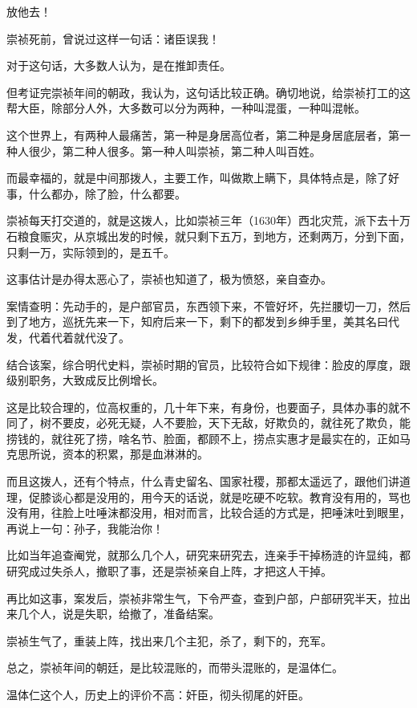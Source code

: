 \begin{multicols}{\theparacolNo}
		放他去！

		崇祯死前，曾说过这样一句话：诸臣误我！

		对于这句话，大多数人认为，是在推卸责任。

		但考证完崇祯年间的朝政，我认为，这句话比较正确。确切地说，给崇祯打工的这帮大臣，除部分人外，大多数可以分为两种，一种叫混蛋，一种叫混帐。

		这个世界上，有两种人最痛苦，第一种是身居高位者，第二种是身居底层者，第一种人很少，第二种人很多。第一种人叫崇祯，第二种人叫百姓。

		而最幸福的，就是中间那拨人，主要工作，叫做欺上瞒下，具体特点是，除了好事，什么都办，除了脸，什么都要。

		崇祯每天打交道的，就是这拨人，比如崇祯三年（1630年）西北灾荒，派下去十万石粮食赈灾，从京城出发的时候，就只剩下五万，到地方，还剩两万，分到下面，只剩一万，实际领到的，是五千。

		这事估计是办得太恶心了，崇祯也知道了，极为愤怒，亲自查办。

		案情查明：先动手的，是户部官员，东西领下来，不管好坏，先拦腰切一刀，然后到了地方，巡抚先来一下，知府后来一下，剩下的都发到乡绅手里，美其名曰代发，代着代着就代没了。

		结合该案，综合明代史料，崇祯时期的官员，比较符合如下规律：脸皮的厚度，跟级别职务，大致成反比例增长。

		这是比较合理的，位高权重的，几十年下来，有身份，也要面子，具体办事的就不同了，树不要皮，必死无疑，人不要脸，天下无敌，好欺负的，就往死了欺负，能捞钱的，就往死了捞，啥名节、脸面，都顾不上，捞点实惠才是最实在的，正如马克思所说，资本的积累，那是血淋淋的。

		而且这拨人，还有个特点，什么青史留名、国家社稷，那都太遥远了，跟他们讲道理，促膝谈心都是没用的，用今天的话说，就是吃硬不吃软。教育没有用的，骂也没有用，往脸上吐唾沫都没用，相对而言，比较合适的方式是，把唾沫吐到眼里，再说上一句：孙子，我能治你！

		比如当年追查阉党，就那么几个人，研究来研究去，连亲手干掉杨涟的许显纯，都研究成过失杀人，撤职了事，还是崇祯亲自上阵，才把这人干掉。

		再比如这事，案发后，崇祯非常生气，下令严查，查到户部，户部研究半天，拉出来几个人，说是失职，给撤了，准备结案。

		崇祯生气了，重装上阵，找出来几个主犯，杀了，剩下的，充军。

		总之，崇祯年间的朝廷，是比较混账的，而带头混账的，是温体仁。

		温体仁这个人，历史上的评价不高：奸臣，彻头彻尾的奸臣。


\end{multicols}
